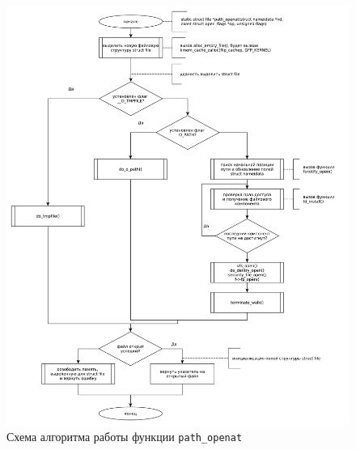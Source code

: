 \clearpage

\begin{figure}[h!btp]
	\centering
	\includegraphics[width=490pt]{inc/path_openat.pdf}
	\caption{Схема алгоритма работы функции \texttt{path\_openat}}
\end{figure}

\clearpage

